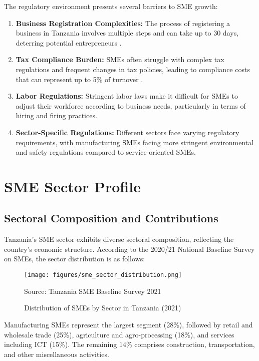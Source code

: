 The regulatory environment presents several barriers to SME growth:
\begin{enumerate}
    \item \textbf{Business Registration Complexities:} The process of registering a business in Tanzania involves multiple steps and can take up to 30 days, deterring potential entrepreneurs \citep{worldbank2020doing}.
    \item \textbf{Tax Compliance Burden:} SMEs often struggle with complex tax regulations and frequent changes in tax policies, leading to compliance costs that can represent up to 5\% of turnover \citep{ifc2019tax}.
    \item \textbf{Labor Regulations:} Stringent labor laws make it difficult for SMEs to adjust their workforce according to business needs, particularly in terms of hiring and firing practices.
    \item \textbf{Sector-Specific Regulations:} Different sectors face varying regulatory requirements, with manufacturing SMEs facing more stringent environmental and safety regulations compared to service-oriented SMEs.
\end{enumerate}

\section{SME Sector Profile}

\subsection{Sectoral Composition and Contributions}

Tanzania's SME sector exhibits diverse sectoral composition, reflecting the country's economic structure. According to the 2020/21 National Baseline Survey on SMEs, the sector distribution is as follows:

\begin{figure}[H]
\centering
\texttt{[image: figures/sme\_sector\_distribution.png]}
\caption{Distribution of SMEs by Sector in Tanzania (2021)}
\label{fig:sme_sectors}
\begin{tablenotes}
\item Source: Tanzania SME Baseline Survey 2021 \citep{tanzania2021sme}
\end{tablenotes}
\end{figure}

Manufacturing SMEs represent the largest segment (28\%), followed by retail and wholesale trade (25\%), agriculture and agro-processing (18\%), and services including ICT (15\%). The remaining 14\% comprises construction, transportation, and other miscellaneous activities.

